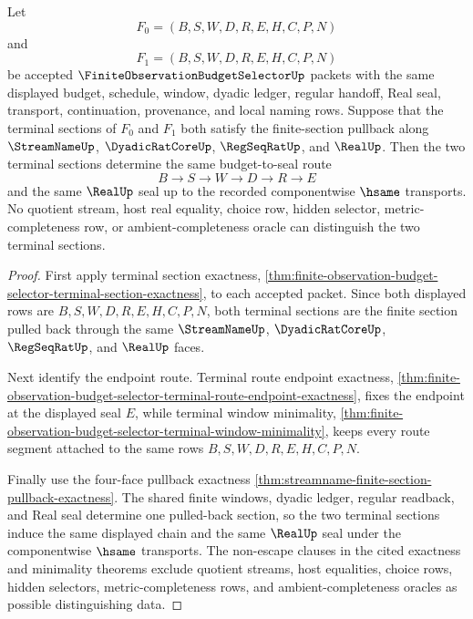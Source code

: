 \begin{theorem}
\label{thm:finite-observation-budget-selector-terminal-section-pullback-uniqueness}
Let
$$
F_0=(B,S,W,D,R,E,H,C,P,N)
$$
and
$$
F_1=(B,S,W,D,R,E,H,C,P,N)
$$
be accepted $\FiniteObservationBudgetSelectorUp$ packets with the same displayed budget, schedule, window, dyadic ledger, regular handoff, Real seal, transport, continuation, provenance, and local naming rows. Suppose that the terminal sections of $F_0$ and $F_1$ both satisfy the finite-section pullback along $\StreamNameUp$, $\DyadicRatCoreUp$, $\RegSeqRatUp$, and $\RealUp$. Then the two terminal sections determine the same budget-to-seal route
$$
B \to S \to W \to D \to R \to E
$$
and the same $\RealUp$ seal up to the recorded componentwise $\hsame$ transports. No quotient stream, host real equality, choice row, hidden selector, metric-completeness row, or ambient-completeness oracle can distinguish the two terminal sections.
\end{theorem}
\begin{proof}
First apply terminal section exactness, \autoref{thm:finite-observation-budget-selector-terminal-section-exactness}, to each accepted packet. Since both displayed rows are $B,S,W,D,R,E,H,C,P,N$, both terminal sections are the finite section pulled back through the same $\StreamNameUp$, $\DyadicRatCoreUp$, $\RegSeqRatUp$, and $\RealUp$ faces.

Next identify the endpoint route. Terminal route endpoint exactness, \autoref{thm:finite-observation-budget-selector-terminal-route-endpoint-exactness}, fixes the endpoint at the displayed seal $E$, while terminal window minimality, \autoref{thm:finite-observation-budget-selector-terminal-window-minimality}, keeps every route segment attached to the same rows $B,S,W,D,R,E,H,C,P,N$.

Finally use the four-face pullback exactness \autoref{thm:streamname-finite-section-pullback-exactness}. The shared finite windows, dyadic ledger, regular readback, and Real seal determine one pulled-back section, so the two terminal sections induce the same displayed chain and the same $\RealUp$ seal under the componentwise $\hsame$ transports. The non-escape clauses in the cited exactness and minimality theorems exclude quotient streams, host equalities, choice rows, hidden selectors, metric-completeness rows, and ambient-completeness oracles as possible distinguishing data.
\end{proof}

